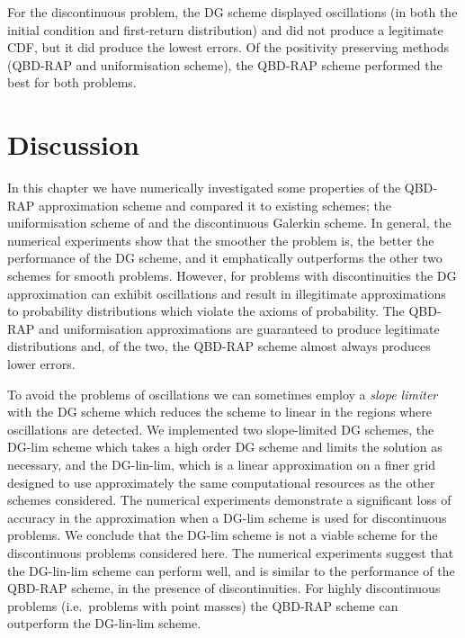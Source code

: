 For the discontinuous problem, the DG scheme displayed oscillations (in both the initial condition and first-return distribution) and did not produce a legitimate CDF, but it did produce the lowest errors. Of the positivity preserving methods (QBD-RAP and uniformisation scheme), the QBD-RAP scheme performed the best for both problems. 
\FloatBarrier


\section{Discussion}
In this chapter we have numerically investigated some properties of the QBD-RAP approximation scheme and compared it to existing schemes; the uniformisation scheme of \cite{bo2013} and the discontinuous Galerkin scheme. In general, the numerical experiments show that the smoother the problem is, the better the performance of the DG scheme, and it emphatically outperforms the other two schemes for smooth problems. However, for problems with discontinuities the DG approximation can exhibit oscillations and result in illegitimate approximations to probability distributions which violate the axioms of probability. The QBD-RAP and uniformisation approximations are guaranteed to produce legitimate distributions and, of the two, the QBD-RAP scheme almost always produces lower errors. 

To avoid the problems of oscillations we can sometimes employ a \emph{slope limiter} with the DG scheme which reduces the scheme to linear in the regions where oscillations are detected. We implemented two slope-limited DG schemes, the DG-lim scheme which takes a high order DG scheme and limits the solution as necessary, and the DG-lin-lim, which is a linear approximation on a finer grid designed to use approximately the same computational resources as the other schemes considered. The numerical experiments demonstrate a significant loss of accuracy in the approximation when a DG-lim scheme is used for discontinuous problems. We conclude that the DG-lim scheme is not a viable scheme for the discontinuous problems considered here. The numerical experiments suggest that the DG-lin-lim scheme can perform well, and is similar to the performance of the QBD-RAP scheme, in the presence of discontinuities. For highly discontinuous problems (i.e.~problems with point masses) the QBD-RAP scheme can outperform the DG-lin-lim scheme. %

